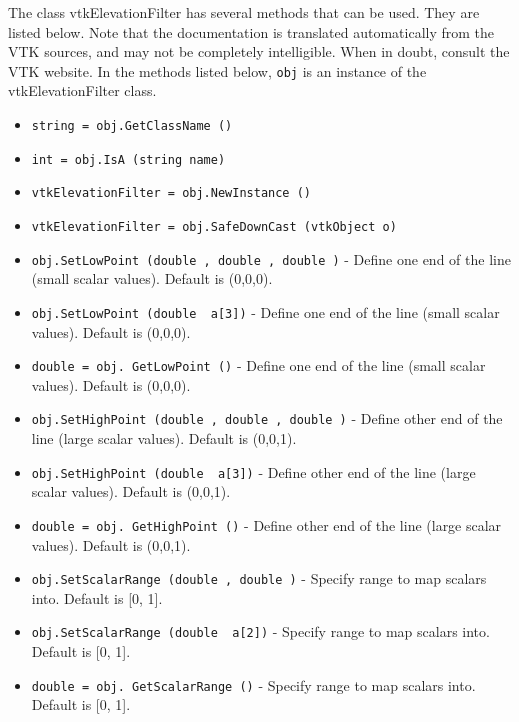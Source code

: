 The class vtkElevationFilter has several methods that can be used.
  They are listed below.
Note that the documentation is translated automatically from the VTK sources,
and may not be completely intelligible.  When in doubt, consult the VTK website.
In the methods listed below, \verb|obj| is an instance of the vtkElevationFilter class.
\begin{itemize}
\item  \verb|string = obj.GetClassName ()|

\item  \verb|int = obj.IsA (string name)|

\item  \verb|vtkElevationFilter = obj.NewInstance ()|

\item  \verb|vtkElevationFilter = obj.SafeDownCast (vtkObject o)|

\item  \verb|obj.SetLowPoint (double , double , double )| -  Define one end of the line (small scalar values).  Default is
 (0,0,0).

\item  \verb|obj.SetLowPoint (double  a[3])| -  Define one end of the line (small scalar values).  Default is
 (0,0,0).

\item  \verb|double = obj. GetLowPoint ()| -  Define one end of the line (small scalar values).  Default is
 (0,0,0).

\item  \verb|obj.SetHighPoint (double , double , double )| -  Define other end of the line (large scalar values).  Default is
 (0,0,1).

\item  \verb|obj.SetHighPoint (double  a[3])| -  Define other end of the line (large scalar values).  Default is
 (0,0,1).

\item  \verb|double = obj. GetHighPoint ()| -  Define other end of the line (large scalar values).  Default is
 (0,0,1).

\item  \verb|obj.SetScalarRange (double , double )| -  Specify range to map scalars into.  Default is [0, 1].

\item  \verb|obj.SetScalarRange (double  a[2])| -  Specify range to map scalars into.  Default is [0, 1].

\item  \verb|double = obj. GetScalarRange ()| -  Specify range to map scalars into.  Default is [0, 1].

\end{itemize}
